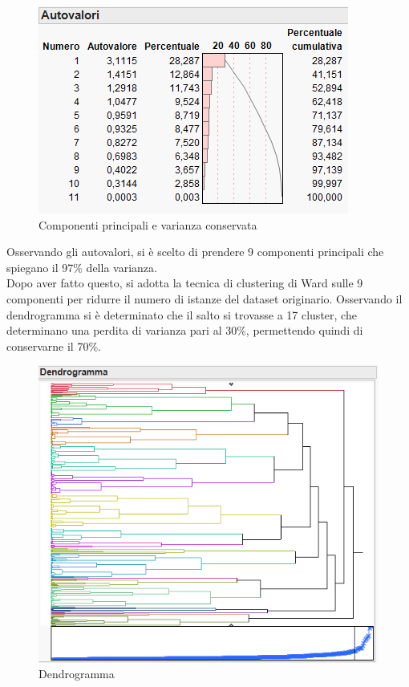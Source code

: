 		\begin{figure}[H]
			\centering
			\includegraphics[scale=0.85]{./immagine/autovalori_ex3.png}
			\caption{Componenti principali e varianza conservata}
			\label{fig:autovalori_ex3}
		\end{figure}
		
		Osservando gli autovalori, si è scelto di prendere 9 componenti principali che spiegano il 97\% della varianza.\\
		Dopo aver fatto questo, si adotta la tecnica di clustering di Ward sulle 9 componenti per ridurre il numero di istanze del dataset originario. Osservando il dendrogramma si è determinato che il salto si trovasse a 17 cluster, che determinano una perdita di varianza pari al 30\%, permettendo quindi di conservarne il 70\%.
		
		\begin{figure}[H]
			\centering
			\includegraphics[scale=0.85]{./immagine/dendrogramma_ex3.png}
			\caption{Dendrogramma}
			\label{fig:dendrogramma_ex3}
		\end{figure}
		
